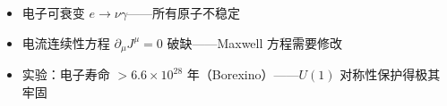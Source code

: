 \begin{limitbox}
  \begin{itemize}
    \item 电子可衰变 $e \to \nu\gamma$——所有原子不稳定
    \item 电流连续性方程 $\partial_\mu J^\mu=0$ 破缺——Maxwell 方程需要修改
    \item 实验：电子寿命 $> 6.6\times10^{28}$ 年（Borexino）——$U(1)$ 对称性保护得极其牢固
  \end{itemize}
\end{limitbox}

